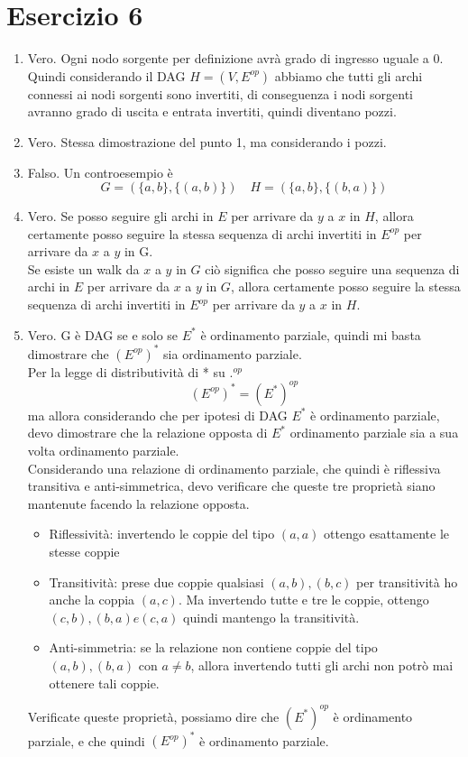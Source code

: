 \documentclass{article}
\begin{document}
\section{Esercizio 6}
\begin{enumerate}
    \item Vero. Ogni nodo sorgente per definizione avrà grado di ingresso uguale a 0. Quindi considerando il DAG \(H = (V, E^{op})\) abbiamo che tutti gli archi connessi ai nodi sorgenti sono invertiti, di conseguenza i nodi sorgenti avranno grado di uscita e entrata invertiti, quindi diventano pozzi.
    \item Vero. Stessa dimostrazione del punto 1, ma considerando i pozzi.
    \item Falso. Un controesempio è
          \[G = (\{a,b\}, \{(a,b)\}) \quad H = (\{a,b\}, \{(b,a)\})\]
    \item Vero. Se posso seguire gli archi in \(E\) per arrivare da \(y\) a \(x\) in \(H\), allora certamente posso seguire la stessa sequenza di archi invertiti in \(E^{op}\) per arrivare da \(x\) a \(y\) in G. \\
          Se esiste un walk da \(x\) a \(y\) in \(G\) ciò significa che posso seguire una sequenza di archi in \(E\) per arrivare da \(x\) a \(y\) in \(G\), allora certamente posso seguire la stessa sequenza di archi invertiti in \(E^{op}\) per arrivare da \(y\) a \(x\) in \(H\).
    \item Vero. G è DAG se e solo se \(E^*\) è ordinamento parziale, quindi mi basta dimostrare che \((E^{op})^*\) sia ordinamento parziale.\\
          Per la legge di distributività di * su \(.^{op}\)
          \[(E^{op})^* = (E^*)^{op}\]
          ma allora considerando che per ipotesi di DAG \(E^*\) è ordinamento parziale, devo dimostrare che la relazione opposta di \(E^*\) ordinamento parziale sia a sua volta ordinamento parziale. \\
          Considerando una relazione di ordinamento parziale, che quindi è riflessiva transitiva e anti-simmetrica, devo verificare che queste tre proprietà siano mantenute facendo la relazione opposta.
          \begin{itemize}
              \item Riflessività: invertendo le coppie del tipo \((a,a)\) ottengo esattamente le stesse coppie
              \item Transitività: prese due coppie qualsiasi \((a,b), (b,c)\) per transitività ho anche la coppia \((a,c)\). Ma invertendo tutte e tre le coppie, ottengo \((c,b), (b,a) e(c,a)\) quindi mantengo la transitività.
              \item Anti-simmetria: se la relazione non contiene coppie del tipo \((a,b), (b,a)\) con \(a \neq b\), allora invertendo tutti gli archi non potrò mai ottenere tali coppie.
          \end{itemize}
          Verificate queste proprietà, possiamo dire che \((E^*)^{op}\) è ordinamento parziale, e che quindi \((E^{op})^*\) è ordinamento parziale.
\end{enumerate}
\end{document}
